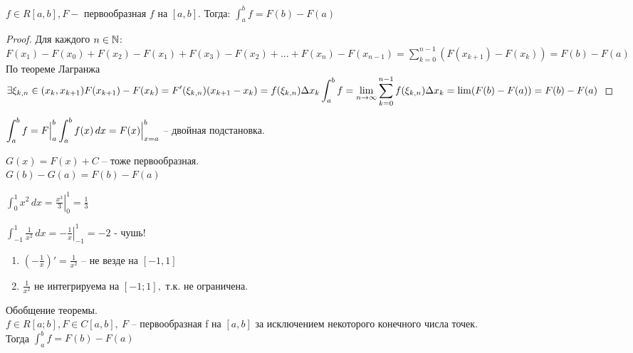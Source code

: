 \begin{Thm} 
	$f \in R[a,b], F -$ первообразная $f$ на $[a,b]$. Тогда: $\displaystyle \int_{a}^{b} f = F(b) - F(a)$
\end{Thm} 

\begin{proof}
	Для каждого $n \in \mathbb{N}$:\\ %
	$\displaystyle F(x_1) - F(x_0) + F(x_2) - F(x_1) + F(x_3) - F(x_2) + ... + F(x_n) - F(x_{n-1}) = 
	\sum_{k=0}^{n-1} (F(x_{k+1}) - F(x_k)) = F(b) - F(a)$\\
	По теореме Лагранжа $\displaystyle \exists \xi_{k,n} \in (x_k, x_{k+1})\\ F(x_{k+1}) - F(x_k) = F'(\xi_{k, n})(x_{k+1} - x_k) =
	f(\xi_{k,n}) \Delta x_k\\
	\int_{a}^{b} f = \lim_{n \to \infty} \sum_{k=0}^{n-1} f(\xi_{k, n}) \Delta x_k = \lim (F(b) - F(a)) = F(b) - F(a)$
\end{proof}

\begin{Rem}
	$\displaystyle \int_{a}^{b} f = F \Big|^b_a\\
	\int_{a}^{b} f(x)\,dx = F(x) \Big|^b_{x = a}$ -- двойная подстановка.
\end{Rem}

\begin{Rem}
	$G(x) = F(x) + C$ -- тоже первообразная.\\
	$G(b) - G(a) = F(b) - F(a)$
\end{Rem}

\begin{Example}
	$\displaystyle \int_{0}^{1} x^2 \,dx = \left. \frac{x^3}{3} \right|^1_0 = \frac{1}{3}$
\end{Example}

\begin{Example}
	$\displaystyle \int_{-1}^{1} \frac{1}{x^2} \,dx = - \left. \frac{1}{x} \right|^1_{-1} = -2$ - чушь!
	\begin{enumerate}
		\item $\left(-\frac{1}{x}\right)' = \frac{1}{x^2}$ -- не везде на $[-1,1]$
		\item $\frac{1}{x^2}$ не интегрируема на $[-1; 1], $ т.к. не ограничена.
	\end{enumerate}
\end{Example}

\begin{Rem}
	Обобщение теоремы.\\
	$f \in R[a; b], F \in C[a,b], \ F$ -- первообразная f на $[a,b]$ за исключением некоторого конечного числа точек.\\
	Тогда $\displaystyle \int_{a}^{b} f	= F(b) - F(a)$
\end{Rem}

